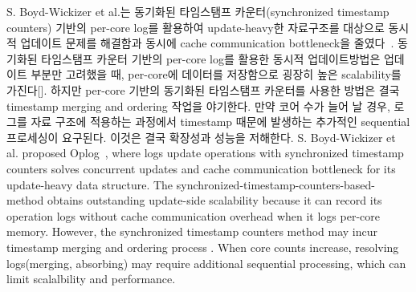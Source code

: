 \fi

\ifkor
S. Boyd-Wickizer et al.는 동기화된 타임스탬프 카운터(synchronized timestamp counters) 기반의
per-core log를 활용하여 update-heavy한 자료구조를 대상으로 동시적 업데이트 문제를
해결함과 동시에 cache communication bottleneck을 줄였다~\cite{SilasBoydWickizerPth}.
동기화된 타임스탬프 카운터 기반의 per-core log를 활용한 동시적 업데이트방법은
업데이트 부분만 고려했을 때, per-core에 데이터를 저장함으로 굉장히 높은 scalability를 가진다[].
하지만 per-core 기반의 동기화된 타임스탬프 카운터를 사용한 방법은 결국 timestamp merging and ordering 작업을
야기한다.
만약 코어 수가 늘어 날 경우, 로그를 자료 구조에 적용하는 과정에서 timestamp 때문에 발생하는 추가적인 sequential 프로세싱이
요구된다.
이것은 결국 확장성과 성능을 저해한다. 
\else
S. Boyd-Wickizer et al. proposed Oplog~\cite{SilasBoydWickizerPth}, where logs
update operations with synchronized timestamp counters solves concurrent
updates and cache communication bottleneck for its update-heavy data structure.
The synchronized-timestamp-counters-based-method obtains outstanding
update-side scalability because it can record its operation logs without
cache communication overhead when it logs per-core memory.
However, the synchronized timestamp counters method may incur timestamp merging
and ordering process .
When core counts increase, resolving logs(merging, absorbing) may require
additional sequential processing, which can limit scalalbility and performance.
\fi



